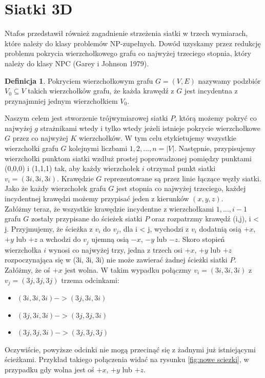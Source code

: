 \documentclass[brudnopis]{xmgr}
\theoremstyle{definition}
\newtheorem{Definicja}{Definicja}
\begin{document}
 \section{Siatki 3D}
 	Ntafos przedstawił również zagadnienie strzeżenia siatki w trzech wymiarach, które należy do klasy problemów NP-zupełnych. Dowód uzyskamy przez redukcję problemu pokrycia wierzchołkowego grafu co najwyżej trzeciego stopnia, który należy do klasy NPC (Garey i Johnson 1979).
\begin{Definicja}
	Pokryciem wierzchołkowym grafu $G = (V,E)$ nazywamy podzbiór $V_0 \subseteq V$ takich wierzchołków grafu, że każda krawędź z $G$ jest incydentna z przynajmniej jednym wierzchołkiem $V_0$.
\end{Definicja}
Naszym celem jest stworzenie trójwymiarowej siatki $P$, którą możemy pokryć co najwyżej $g$ strażnikami wtedy i tylko wtedy jeżeli istnieje pokrycie wierzchołkowe $G$ przez co najwyżej $K$ wierzchołków.
W tym celu etykietujemy wszystkie wierzchołki grafu $G$ kolejnymi liczbami $1,2,\ldots,n = |V|$. Następnie, przypisujemy wierzchołki punktom siatki wzdłuż prostej poprowadzonej pomiędzy punktami (0,0,0) i (1,1,1) tak, aby każdy wierzchołek $i$ otrzymał punkt siatki $v_i = (3i, 3i, 3i)$. Krawędzie $G$ reprezentowane są przez linie łączące węzły siatki. Jako że każdy wierzchołek grafu $G$ jest stopnia co najwyżej trzeciego, każdej incydentnej krawędzi możemy przypisać jeden z kierunków $(x,y,z)$.
\\\indent Załóżmy teraz, że wszystkie krawędzie incydentne z wierzchołkami $1,\ldots,i-1$ grafu $G$ zostały przypisane do ścieżek siatki $P$ oraz rozpatrzmy krawędź (i,j), i < j. Przyjmujemy, że ścieżka z $v_i$ do $v_j$, dla i < j, wychodzi z $v_i$ dodatnią osią $+x$, $+y$ lub $+z$ a wchodzi do $v_j$ ujemną osią $-x$, $-y$ lub $-z$. Skoro stopień wierzchołka $i$ wynosi co najwyżej trzy, jedna z trzech osi $+x$, $+y$ lub $+z$ rozpoczynająca się w (3i, 3i, 3i) nie może zawierać żadnej ścieżki siatki $P$. Załóżmy, że oś $+x$ jest wolna. W takim wypadku połączmy $v_i = (3i, 3i, 3i)$ z $v_j = (3j, 3j, 3j)$ trzema odcinkami:
\begin{itemize}
	\item $(3i, 3i, 3i) -> (3j, 3i, 3i)$
	\item $(3j, 3i, 3i) -> (3j, 3j, 3i)$
	\item $(3j, 3j, 3i) -> (3j, 3j, 3j)$
\end{itemize}
Oczywiście, powyższe odcinki nie mogą przecinąć się z żadnymi już istniejącymi ścieżkami. Przykład takiego połączenia widać na rysunku \ref{fig:nowe sciezki}, w przypadku gdy wolna jest oś $+x$, $+y$ lub $+z$.
\end{document}
